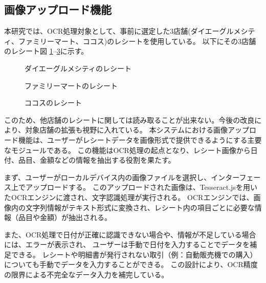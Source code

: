 \documentclass[main]{subfiles}
\begin{document}
\subsection{画像アップロード機能}

本研究では、OCR処理対象として、事前に選定した3店舗(ダイエーグルメシティ、ファミリーマート、ココス)のレシートを使用している。
以下にその3店舗のレシート図 \ref{fig:daie}--\ref{fig:cocos}に示す。
\begin{figure}[tb]
    \begin{center}
        \caption{ダイエーグルメシティのレシート}
        \label{fig:daie}
    \end{center}
\end{figure}
\begin{figure}[tb]
    \begin{center}
        \caption{ファミリーマートのレシート}
        \label{fig:familymart}
    \end{center}
\end{figure}
\begin{figure}[tb]
    \begin{center}
        \caption{ココスのレシート}
        \label{fig:cocos}
    \end{center}
\end{figure}
このため、他店舗のレシートに関しては読み取ることが出来ない。今後の改良により、対象店舗の拡張も視野に入れている。
本システムにおける画像アップロード機能は、ユーザーがレシートデータを画像形式で提供できるようにする主要なモジュールである。
この機能はOCR処理の起点となり、レシート画像から日付、品目、金額などの情報を抽出する役割を果たす。

まず、ユーザーがローカルデバイス内の画像ファイルを選択し、インターフェース上でアップロードする。
このアップロードされた画像は、Tesseract.jsを用いたOCRエンジンに渡され、文字認識処理が実行される。
OCRエンジンでは、画像内の文字列情報がテキスト形式に変換され、レシート内の項目ごとに必要な情報（品目や金額）が抽出される。

また、OCR処理で日付が正確に認識できない場合や、情報が不足している場合には、エラーが表示され、
ユーザーは手動で日付を入力することでデータを補足できる。
レシートや明細書が発行されない取引（例：自動販売機での購入）についても手動でデータを入力することができる。
この設計により、OCR精度の限界による不完全なデータ入力を補完している。
\end{document}
